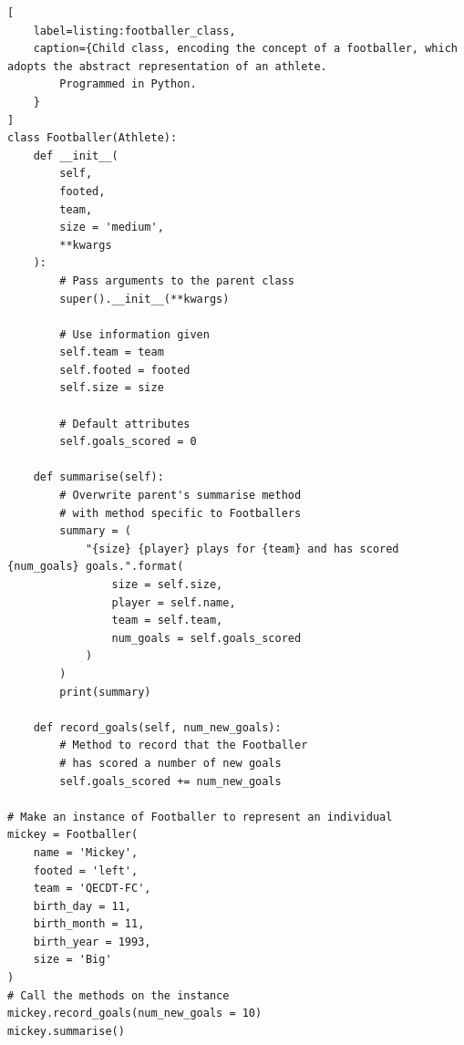 \begin{lstlisting}[
    label=listing:footballer_class,
    caption={Child class, encoding the concept of a footballer, which adopts the abstract representation of an athlete. 
        Programmed in Python.
    }
]
class Footballer(Athlete):
    def __init__(
        self, 
        footed,
        team, 
        size = 'medium',
        **kwargs
    ):
        # Pass arguments to the parent class
        super().__init__(**kwargs)
        
        # Use information given
        self.team = team
        self.footed = footed
        self.size = size
        
        # Default attributes
        self.goals_scored = 0 

    def summarise(self):
        # Overwrite parent's summarise method
        # with method specific to Footballers
        summary = ( 
            "{size} {player} plays for {team} and has scored {num_goals} goals.".format(
                size = self.size, 
                player = self.name, 
                team = self.team, 
                num_goals = self.goals_scored
            )
        )
        print(summary)
        
    def record_goals(self, num_new_goals):
        # Method to record that the Footballer 
        # has scored a number of new goals
        self.goals_scored += num_new_goals
        
# Make an instance of Footballer to represent an individual
mickey = Footballer(
    name = 'Mickey', 
    footed = 'left',
    team = 'QECDT-FC',
    birth_day = 11,
    birth_month = 11, 
    birth_year = 1993,
    size = 'Big'
)
# Call the methods on the instance
mickey.record_goals(num_new_goals = 10)
mickey.summarise()    
\end{lstlisting}

